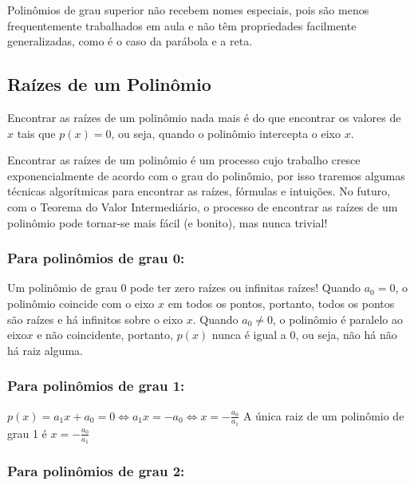 \documentclass[
  portuguese,
  letterpaper,
  DIV=11,
  numbers=noendperiod]{scrreport}
\begin{document}
Polinômios de grau superior não recebem nomes especiais, pois são menos
frequentemente trabalhados em aula e não têm propriedades facilmente
generalizadas, como é o caso da parábola e a reta.

\subsection{Raízes de um Polinômio}\label{rauxedzes-de-um-polinuxf4mio}

Encontrar as raízes de um polinômio nada mais é do que encontrar os
valores de \(x\) tais que \(p(x) = 0\), ou seja, quando o polinômio
intercepta o eixo \(x\).

Encontrar as raízes de um polinômio é um processo cujo trabalho cresce
exponencialmente de acordo com o grau do polinômio, por isso traremos
algumas técnicas algorítmicas para encontrar as raízes, fórmulas e
intuições. No futuro, com o Teorema do Valor Intermediário, o processo
de encontrar as raízes de um polinômio pode tornar-se mais fácil (e
bonito), mas nunca trivial!

\subsubsection{Para polinômios de grau
0:}\label{para-polinuxf4mios-de-grau-0}

Um polinômio de grau 0 pode ter zero raízes ou infinitas raízes! Quando
\(a_0=0\), o polinômio coincide com o eixo \(x\) em todos os pontos,
portanto, todos os pontos são raízes e há infinitos sobre o eixo \(x\).
Quando \(a_0 \neq 0\), o polinômio é paralelo ao eixo\(x\) e não
coincidente, portanto, \(p(x)\) nunca é igual a \(0\), ou seja, não há
não há raiz alguma.

\subsubsection{Para polinômios de grau
1:}\label{para-polinuxf4mios-de-grau-1}

\(p(x) = a_1x+a_0 =0 \Leftrightarrow a_1x=-a_0 \Leftrightarrow x = -\frac{a_0}{a_1}\)
A única raiz de um polinômio de grau 1 é \(x=-\frac{a_0}{a_1}\)

\subsubsection{Para polinômios de grau
2:}\label{para-polinuxf4mios-de-grau-2}
\end{document}
